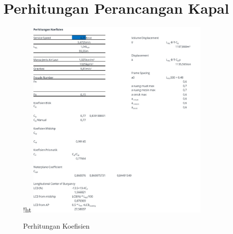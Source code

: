 \section*{Perhitungan Perancangan Kapal}
\label{sec:itungan-deskap}

\begin{figure}{!ht}
    \centering
    \includegraphics[width=0.8\textwidth]{lampiran/deskap-1.jpg}
    \caption*{Perhitungan Koefisien}
\end{figure}

